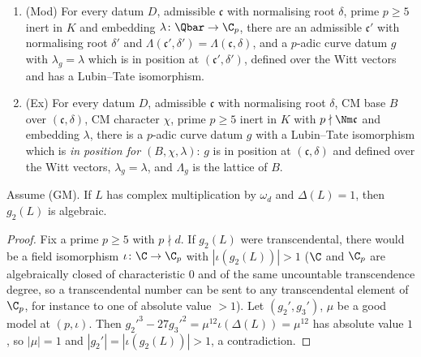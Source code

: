 \begin{definition}\label{pf:reckernel:def-Mod}
\begin{enumerate}
\item \textup{(Mod)} For every datum $D$, admissible $\mathfrak c$ with normalising root $\delta$, prime $p\ge5$ inert in
  $K$ and embedding $\lambda\colon\Qbar\to\C_p$, there are an admissible $\mathfrak c'$ with normalising root $\delta'$
  and $\Lambda(\mathfrak c',\delta')=\Lambda(\mathfrak c,\delta)$, and a $p$-adic curve datum $g$ with $\lambda_g=\lambda$
  which is in position at $(\mathfrak c',\delta')$, defined over the Witt vectors and has a Lubin--Tate isomorphism.
\item \textup{(Ex)} For every datum $D$, admissible $\mathfrak c$ with normalising root $\delta$, CM base $B$ over
  $(\mathfrak c,\delta)$, CM character $\chi$, prime $p\ge5$ inert in $K$ with $p\nmid\Nm\mathfrak c$ and embedding
  $\lambda$, there is a $p$-adic curve datum $g$ with a Lubin--Tate isomorphism which is \emph{in position for
  $(B,\chi,\lambda)$}: $g$ is in position at $(\mathfrak c,\delta)$ and defined over the Witt vectors,
  $\lambda_g=\lambda$, and $\Lambda_g$ is the lattice of $B$.
\end{enumerate}
\end{definition}

\begin{lemma}\label{pf:reckernel:g2Alg}
Assume \textup{(GM)}. If $L$ has complex multiplication by $\omega_d$ and $\Delta(L)=1$, then $g_2(L)$ is algebraic.
\end{lemma}

\begin{proof}
Fix a prime $p\ge5$ with $p\nmid d$. If $g_2(L)$ were transcendental, there would be a field isomorphism
$\iota\colon\C\to\C_p$ with $|\iota(g_2(L))|>1$ ($\C$ and $\C_p$ are algebraically closed of characteristic $0$ and of the same
uncountable transcendence degree, so a transcendental number can be sent to any transcendental element of $\C_p$,
for instance to one of absolute value $>1$). Let $(g_2',g_3')$, $\mu$ be a good
model at $(p,\iota)$. Then $g_2'^3-27g_3'^2=\mu^{12}\iota(\Delta(L))=\mu^{12}$ has absolute value $1$, so $|\mu|=1$ and
$|g_2'|=|\iota(g_2(L))|>1$, a contradiction.
\end{proof}

